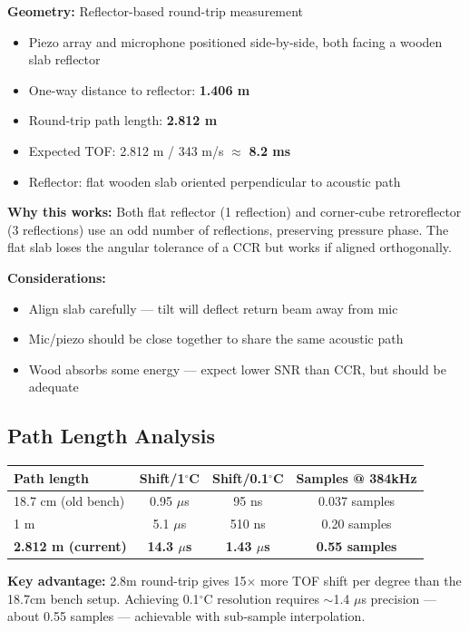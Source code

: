 \documentclass[11pt]{article}
\begin{document}
\textbf{Geometry:} Reflector-based round-trip measurement
\begin{itemize}
    \item Piezo array and microphone positioned side-by-side, both facing a wooden slab reflector
    \item One-way distance to reflector: \textbf{1.406 m}
    \item Round-trip path length: \textbf{2.812 m}
    \item Expected TOF: 2.812 m / 343 m/s $\approx$ \textbf{8.2 ms}
    \item Reflector: flat wooden slab oriented perpendicular to acoustic path
\end{itemize}

\textbf{Why this works:} Both flat reflector (1 reflection) and corner-cube retroreflector (3 reflections) use an odd number of reflections, preserving pressure phase. The flat slab loses the angular tolerance of a CCR but works if aligned orthogonally.

\textbf{Considerations:}
\begin{itemize}
    \item Align slab carefully --- tilt will deflect return beam away from mic
    \item Mic/piezo should be close together to share the same acoustic path
    \item Wood absorbs some energy --- expect lower SNR than CCR, but should be adequate
\end{itemize}

\subsection{Path Length Analysis}

\begin{table}[h]
\centering
\begin{tabular}{lccc}
\toprule
Path length & Shift/1$^\circ$C & Shift/0.1$^\circ$C & Samples @ 384kHz \\
\midrule
18.7 cm (old bench) & 0.95 $\mu$s & 95 ns & 0.037 samples \\
1 m & 5.1 $\mu$s & 510 ns & 0.20 samples \\
\textbf{2.812 m (current)} & \textbf{14.3 $\mu$s} & \textbf{1.43 $\mu$s} & \textbf{0.55 samples} \\
\bottomrule
\end{tabular}
\end{table}

\textbf{Key advantage:} 2.8m round-trip gives 15$\times$ more TOF shift per degree than the 18.7cm bench setup. Achieving 0.1$^\circ$C resolution requires $\sim$1.4 $\mu$s precision --- about 0.55 samples --- achievable with sub-sample interpolation.
\end{document}
